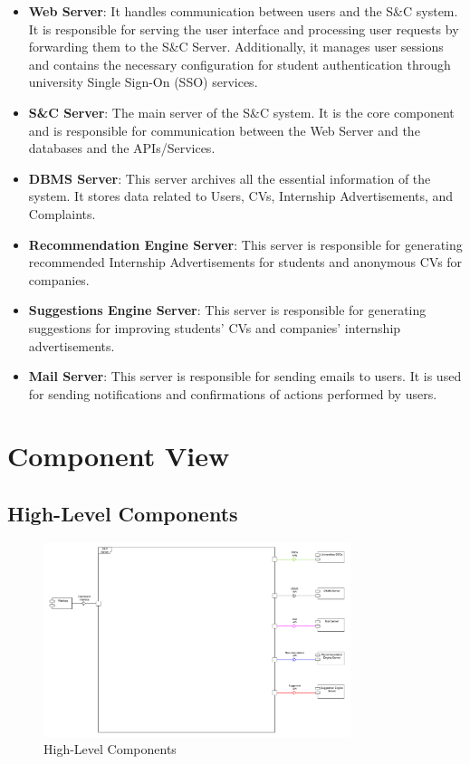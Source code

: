 \begin{itemize}
      \item \textbf{Web Server}: It handles communication between users and the S\&C system. It is responsible for
            serving the user interface and processing user requests by forwarding them to the S\&C Server.
            Additionally, it manages user sessions and contains the necessary configuration for student authentication
            through university Single Sign-On (SSO) services.
      \item \textbf{S\&C Server}: The main server of the S\&C system. It is the core component and is responsible
            for communication between the Web Server and the databases and the APIs/Services.
      \item \textbf{DBMS Server}: This server archives all the essential information of the system.
            It stores data related to Users, CVs, Internship Advertisements, and Complaints.
      \item \textbf{Recommendation Engine Server}: This server is responsible for generating recommended Internship
            Advertisements for students and anonymous CVs for companies.
      \item \textbf{Suggestions Engine Server}: This server is responsible for generating suggestions for improving
            students' CVs and companies' internship advertisements.
      \item \textbf{Mail Server}: This server is responsible for sending emails to users. It is used for sending
            notifications and confirmations of actions performed by users.
\end{itemize}

\section{Component View}
\label{sec:component-view}%

\subsection{High-Level Components}
\label{sub:high-level-components}%

\begin{figure}[H]
      \centering
      \includegraphics[width=0.8\textwidth]{Images/High_Level_Architectural_Design.pdf}
      \caption{High-Level Components}
      \label{fig:high-level-components}
\end{figure}

